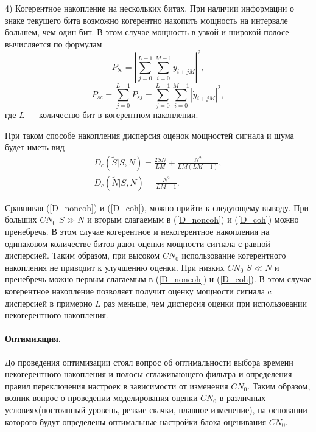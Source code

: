 \documentclass{article}
\begin{document}
4) Когерентное накопление на нескольких битах. При наличии информации о знаке текущего бита возможно когерентно накопить мощность на интервале большем, чем один бит. В этом случае мощность в узкой и широкой полосе вычисляется по формулам
\begin{equation}
P_{bc} = \left|\sum_{j=0}^{L-1}\sum_{i=0}^{M-1}\dot{y}_{i+jM}\right|^{2},
\end{equation}
\begin{equation}
P_{sc} = \sum_{j=0}^{L-1}P_{sj} = \sum_{j=0}^{L-1} \sum_{i=0}^{M-1}\left|\dot{y}_{i+jM}\right|^{2},
\end{equation}
где $L$ --- количество бит в когерентном накоплении.

При таком способе накопления дисперсия оценок мощностей сигнала и шума будет иметь вид
\begin{gather}
D_{c}(\widetilde{S}|S, N) = \frac{2SN}{LM} + \frac{N^{2}}{LM(LM-1)}, \label{D_coh}\\
D_{c}(\widetilde{N}|S, N) = \frac{N^{2}}{LM-1}.
\end{gather}

Сравнивая (\ref{D_noncoh}) и (\ref{D_coh}), можно прийти к следующему выводу. При больших $CN_{0}$ $S \gg N$ и вторым слагаемым в (\ref{D_noncoh}) и (\ref{D_coh}) можно пренебречь. В этом случае когерентное и некогерентное накопления на одинаковом количестве битов дают оценки мощности сигнала с равной дисперсией. Таким образом, при высоком $CN_{0}$ использование когерентного накопления не приводит к улучшению оценки. При низких $CN_{0}$ $S \ll N$ и пренебречь можно первым слагаемым в (\ref{D_noncoh}) и (\ref{D_coh}). В этом случае когерентное накопление позволяет получит оценку мощности сигнала c дисперсией в примерно $L$ раз меньше, чем дисперсия оценки при использовании некогерентного накопления.  

\paragraph{Оптимизация. \\}

До проведения оптимизации стоял вопрос об оптимальности выбора времени некогерентного накопления и полосы сглаживающего фильтра и определения правил переключения настроек в зависимости от изменения $CN_{0}$.
Таким образом, возник вопрос о проведении моделирования оценки $CN_{0}$ в различных условиях(постоянный уровень, резкие скачки, плавное изменение), на основании которого будут определены оптимальные настройки блока оценивания $CN_{0}$.
\end{document}
